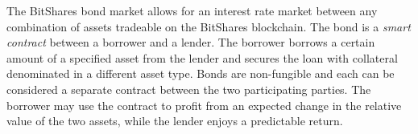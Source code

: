 The BitShares bond market allows for an interest rate market between any
combination of assets tradeable on the BitShares blockchain. The bond is a
\emph{smart contract} between a borrower and a lender. The borrower borrows a
certain amount of a specified asset from the lender and secures the loan with
collateral denominated in a different asset type. Bonds are non-fungible and
each can be considered a separate contract between the two participating
parties. The borrower may use the contract to profit from an expected change
in the relative value of the two assets, while the lender enjoys a predictable
return.
